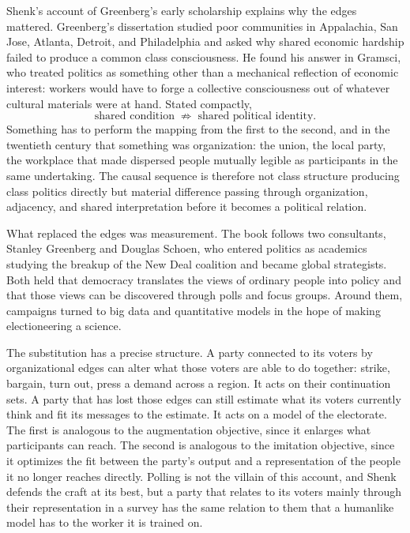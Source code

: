 \documentclass[11pt]{article}
\begin{document}
Shenk's account of Greenberg's early scholarship explains why the edges mattered. Greenberg's dissertation studied poor communities in Appalachia, San Jose, Atlanta, Detroit, and Philadelphia and asked why shared economic hardship failed to produce a common class consciousness. He found his answer in Gramsci, who treated politics as something other than a mechanical reflection of economic interest: workers would have to forge a collective consciousness out of whatever cultural materials were at hand. Stated compactly,
\[
\text{shared condition} \;\not\Rightarrow\; \text{shared political identity}.
\]
Something has to perform the mapping from the first to the second, and in the twentieth century that something was organization: the union, the local party, the workplace that made dispersed people mutually legible as participants in the same undertaking. The causal sequence is therefore not class structure producing class politics directly but material difference passing through organization, adjacency, and shared interpretation before it becomes a political relation.

What replaced the edges was measurement. The book follows two consultants, Stanley Greenberg and Douglas Schoen, who entered politics as academics studying the breakup of the New Deal coalition and became global strategists. Both held that democracy translates the views of ordinary people into policy and that those views can be discovered through polls and focus groups. Around them, campaigns turned to big data and quantitative models in the hope of making electioneering a science.

The substitution has a precise structure. A party connected to its voters by organizational edges can alter what those voters are able to do together: strike, bargain, turn out, press a demand across a region. It acts on their continuation sets. A party that has lost those edges can still estimate what its voters currently think and fit its messages to the estimate. It acts on a model of the electorate. The first is analogous to the augmentation objective, since it enlarges what participants can reach. The second is analogous to the imitation objective, since it optimizes the fit between the party's output and a representation of the people it no longer reaches directly. Polling is not the villain of this account, and Shenk defends the craft at its best, but a party that relates to its voters mainly through their representation in a survey has the same relation to them that a humanlike model has to the worker it is trained on.
\end{document}

